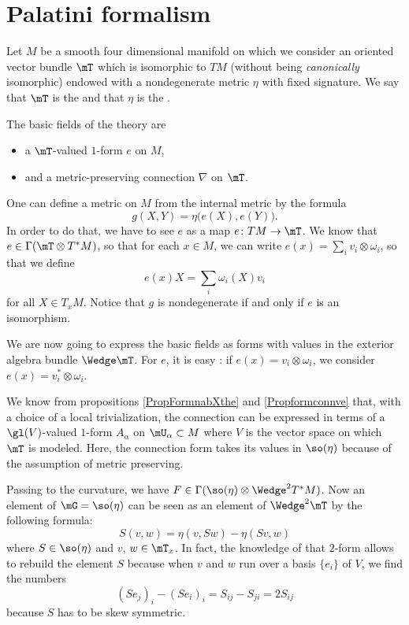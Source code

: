 \section{Palatini formalism}

Let $M$ be a smooth four dimensional manifold on which we consider an oriented vector bundle $\mT$ which is isomorphic to $TM$ (without being \emph{canonically} isomorphic) endowed with a nondegenerate metric $\eta$ with fixed signature. We say that $\mT$ is the  and that $\eta$ is the .

The basic fields of the theory are
\begin{itemize}
\item a $\mT$-valued $1$-form $e$ on $M$,
\item and a metric-preserving connection $\nabla$ on $\mT$.
\end{itemize}
One can define a metric on $M$ from the internal metric by the formula
\begin{equation}
  g(X,Y)=\eta\big( e(X),e(Y) \big).
\end{equation}
In order to do that, we have to see $e$ as a map $e\colon TM\to \mT$. We know that $e\in\Gamma(\mT\otimes T^*M)$, so that for each $x\in M$, we can write $e(x)=\sum_iv_i\otimes\omega_i$, so that we define 
\[ 
  e(x)X=\sum_i\omega_i(X)v_i
\]
for all $X\in T_xM$. Notice that $g$ is nondegenerate if and only if $e$ is an isomorphism.

We are now going to express the basic fields as forms with values in the exterior algebra bundle $\Wedge\mT$. For $e$, it is easy : if $e(x)=v_i\otimes \omega_i$, we consider $e(x)=v_i^*\otimes\omega_i$. 

We know from propositions \ref{PropFormnabXthe} and \ref{Propformconnve} that, with a choice of a local trivialization, the connection can be expressed in terms of a $\gl(V)$-valued $1$-form $A_{\alpha}$ on $\mU_{\alpha}\subset M$ where $V$ is the vector space on which $\mT$ is modeled. Here, the connection form takes its values in $\so(\eta)$ because of the assumption of metric preserving.

Passing to the curvature, we have $F\in\Gamma(\so(\eta)\otimes\Wedge^2T^*M)$. Now an element of $\mG=\so(\eta)$ can be seen as an element of $\Wedge^2\mT$ by the following formula:
\begin{equation}
S(v,w)=\eta(v,Sw)-\eta(Sv,w)
\end{equation}
where $S\in\so(\eta)$ and $v$, $w\in \mT_x$. In fact, the knowledge of that $2$-form allows to rebuild the element $S$ because when $v$ and $w$ run over a basis $\{ e_i \}$ of $V$, we find the numbers
\[ 
  (Se_j)_{i}-(Se_i)_i=S_{ij}-S_{ji}=2S_{ij}
\]
because $S$ has to be skew symmetric.

